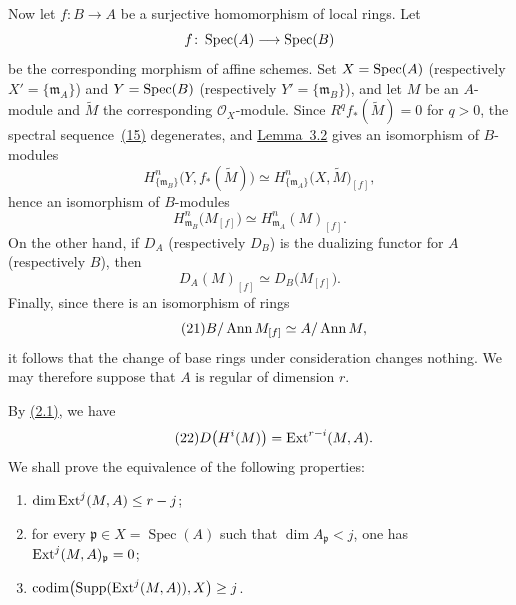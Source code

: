 Now let $f\colon B\to A$ be a surjective homomorphism of local rings. Let
\[
  f\colon \operatorname{Spec}(A)\longrightarrow\operatorname{Spec}(B)
\]
be the corresponding morphism of affine schemes. Set
$X=\operatorname{Spec}(A)$ (respectively $X'=\{\mathfrak m_A\}$) and
$Y=\operatorname{Spec}(B)$ (respectively $Y'=\{\mathfrak m_B\}$), and let $M$ be an
$A$-module and $\widetilde M$ the corresponding $\mathcal O_X$-module. Since
$R^qf_*(\widetilde M)=0$ for $q>0$, the spectral sequence~\textup{\hyperref[eq:V.15]{(15)}}
degenerates, and \hyperref[V.3.2]{Lemma~3.2} gives an isomorphism of $B$-modules
\begin{equation}\tag{18}\label{eq:V.18}
  H_{\{\mathfrak m_B\}}^n\bigl(Y,f_*(\widetilde M)\bigr)
  \simeq
  H_{\{\mathfrak m_A\}}^n\bigl(X,\widetilde M\bigr)_{[f]},
\end{equation}
hence an isomorphism of $B$-modules
\begin{equation}\tag{19}\label{eq:V.19}
  H_{\mathfrak m_B}^n\bigl(M_{[f]}\bigr)
  \simeq
  H_{\mathfrak m_A}^n(M)_{[f]}.
\end{equation}
On the other hand, if $D_A$ (respectively $D_B$) is the dualizing functor for
$A$ (respectively $B$), then
\begin{equation}\tag{20}\label{eq:V.20}
  D_A(M)_{[f]}\simeq D_B\bigl(M_{[f]}\bigr).
\end{equation}
Finally, since there is an isomorphism of rings
\begin{equation}\tag{21}\label{eq:V.21}
  B/\operatorname{Ann} M_{[f]}\simeq A/\operatorname{Ann} M,
\end{equation}
it follows that the change of base rings under consideration changes
nothing. We may therefore suppose that $A$ is regular of dimension $r$.

By \textup{\hyperref[V.2.1]{(2.1)}}, we have
\begin{equation}\tag{22}\label{eq:V.22}
  D\bigl(H^i(M)\bigr)=\operatorname{Ext}^{r-i}(M,A).
\end{equation}
We shall prove the equivalence of the following properties:
\begin{enumerate}
\item[(a)] $\dim \operatorname{Ext}^j(M,A)\leq r-j$;
\item[(b)] for every $\mathfrak p\in X=\operatorname{Spec}(A)$ such that
  $\dim A_{\mathfrak p}<j$, one has
  $\operatorname{Ext}^j(M,A)_{\mathfrak p}=0$;
\item[(c)]
  $\operatorname{codim}\bigl(\operatorname{Supp}(\operatorname{Ext}^j(M,A)),X\bigr)\geq j$.
\end{enumerate}

